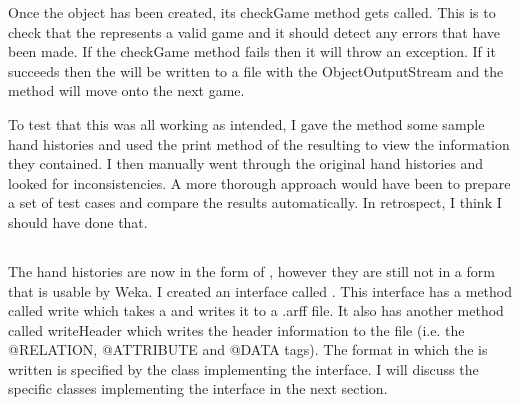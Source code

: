 

Once the \gr object has been created, its checkGame method gets called. This is to check that the \gr represents a valid game and it should detect any errors that have been made. If the checkGame method fails then it will throw an exception. If it succeeds then the \gr will be written to a file with the ObjectOutputStream and the method will move onto the next game.

To test that this was all working as intended, I gave the method some sample hand histories and used the print method of the resulting \grs to view the information they contained. I then manually went through the original hand histories and looked for inconsistencies. A more thorough approach would have been to prepare a set of test cases and compare the results automatically. In retrospect, I think I should have done that.


\subsection{\wf}									%

The hand histories are now in the form of \grs, however they are still not in a form that is usable by Weka. I created an interface called \wf. This interface has a method called write which takes a \gr and writes it to a .arff file. It also has another method called writeHeader which writes the header information to the file (i.e. the @RELATION, @ATTRIBUTE and @DATA tags). The format in which the \gr is written is specified by the class implementing the interface. 
I will discuss the specific classes implementing the \wf interface in the next section. 

